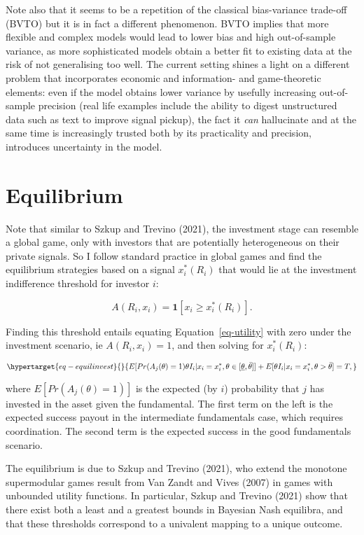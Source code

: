 \documentclass[
]{article}
\theoremstyle{plain}
\theoremstyle{remark}
\begin{document}
Note also that it seems to be a repetition of the classical
bias-variance trade-off (BVTO) but it is in fact a different phenomenon.
BVTO implies that more flexible and complex models would lead to lower
bias and high out-of-sample variance, as more sophisticated models
obtain a better fit to existing data at the risk of not generalising too
well. The current setting shines a light on a different problem that
incorporates economic and information- and game-theoretic elements: even
if the model obtains lower variance by usefully increasing out-of-sample
precision (real life examples include the ability to digest unstructured
data such as text to improve signal pickup), the fact it \emph{can}
hallucinate and at the same time is increasingly trusted both by its
practicality and precision, introduces uncertainty in the model.

\hypertarget{equilibrium}{%
\section{Equilibrium}\label{equilibrium}}

Note that similar to Szkup and Trevino (2021), the investment stage can
resemble a global game, only with investors that are potentially
heterogeneous on their private signals. So I follow standard practice in
global games and find the equilibrium strategies based on a signal
\(x_i^*(R_i)\) that would lie at the investment indifference threshold
for investor \(i\):

\[
A(R_i, x_i) = \mathbf{1}[x_i \geq x_i^*(R_i)].
\]

Finding this threshold entails equating Equation~\ref{eq-utility} with
zero under the investment scenario, ie \(A(R_i, x_i)=1\), and then
solving for \(x_i^*(R_i)\):

\begin{equation}\protect\hypertarget{eq-equilinvest}{}{
E[Pr(A_j(\theta)=1)\theta I_i | x_i = x_i^*, \theta \in [\underline{\theta}, \bar{\theta}] ] + E[\theta I_i |x_i = x_i^*, \theta > \bar{\theta} ] = T,
}\label{eq-equilinvest}\end{equation}

where \(E[Pr(A_j(\theta)=1)]\) is the expected (by \(i\)) probability
that \(j\) has invested in the asset given the fundamental. The first
term on the left is the expected success payout in the intermediate
fundamentals case, which requires coordination. The second term is the
expected success in the good fundamentals scenario.

The equilibrium is due to Szkup and Trevino (2021), who extend the
monotone supermodular games result from Van Zandt and Vives (2007) in
games with unbounded utility functions. In particular, Szkup and Trevino
(2021) show that there exist both a least and a greatest bounds in
Bayesian Nash equilibra, and that these thresholds correspond to a
univalent mapping to a unique outcome.
\end{document}
